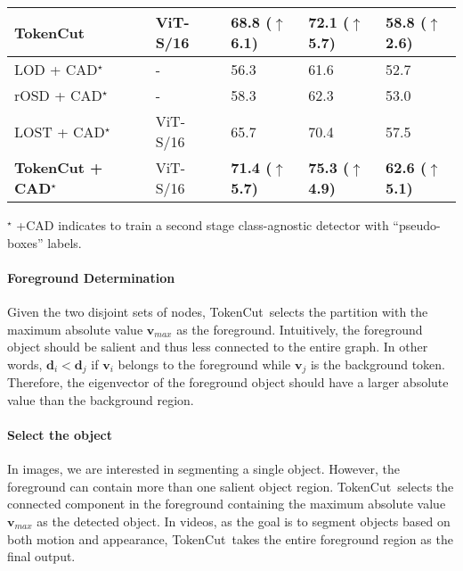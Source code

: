 \documentclass[twocolumn]{article}
\newcommand{\name} {TokenCut}
\newcommand{\feat}{\mathbf{v}}
\newcommand{\degree}{\mathbf{d}}
\newcommand{\cmark}{\ding{51}}\newcommand{\xmark}{\ding{55}}\newcommand\Tstrut{\rule{0pt}{2.6ex}}
\begin{document}
\begin{table*}[!t]
\begin{center}
{\begin{tabular}{lcllll}
    \bf TokenCut &  &  ViT-S/16~\cite{dosovitskiy2020image} & \bf 68.8 (\textcolor{cssgreen}{$\uparrow$ \bf 6.1}) &  \bf 72.1 (\textcolor{cssgreen}{$\uparrow$ \bf 5.7}) &  \bf 58.8 (\textcolor{cssgreen}{$\uparrow$ \bf 2.6})\\ 
    \midrule
    LOD + CAD$^{\star}$~\cite{simeoni2021localizing} & \cmark & -& 56.3 & 61.6 & 52.7 \\
    rOSD + CAD$^{\star}$~\cite{simeoni2021localizing} & \cmark & -& 58.3 & 62.3 & 53.0 \\
    LOST + CAD$^{\star}$~\cite{simeoni2021localizing} &  & ViT-S/16~\cite{dosovitskiy2020image}& 65.7 & 70.4 & 57.5 \\
    \bf TokenCut + CAD$^{\star}$~\cite{simeoni2021localizing} &  & ViT-S/16~\cite{dosovitskiy2020image}& \bf 71.4 (\textcolor{cssgreen}{$\uparrow$ \bf 5.7}) & \bf 75.3 (\textcolor{cssgreen}{$\uparrow$ \bf 4.9})&  \bf 62.6 (\textcolor{cssgreen}{$\uparrow$ \bf 5.1}) \\
\bottomrule
\end{tabular}}
\end{center}
\begin{center}
\vspace{1pt}
  \footnotesize{$^{\star}$ +CAD indicates to train a second stage class-agnostic detector with ``pseudo-boxes'' labels.} 
\end{center}

\end{table*}


\paragraph*{Foreground Determination}
Given the two disjoint sets of nodes, \name~selects the partition with the maximum absolute value $\feat_{max}$ as the foreground. 
Intuitively, the foreground object should be salient and thus less connected to the entire graph. In other words, $\degree_i < \degree_j$ if $\feat_i$ belongs to the foreground while $\feat_j$ is the background token. Therefore, the eigenvector of the foreground object should have a larger absolute value than the  background region. 

\paragraph*{Select the object}
In images, we are interested in segmenting a single object. However,  the foreground can contain more than one salient object region. \name~selects the connected component in the foreground containing the maximum absolute value $\feat_{max}$ as the detected object. In videos, as the goal is to segment objects based on both motion and appearance, \name~takes the entire foreground region as the final output. 
\end{document}
